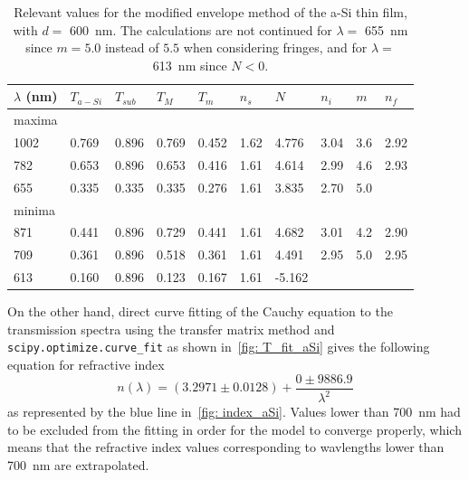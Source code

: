 \begin{table}[tbp]
\centering
\begin{tabular}{llllllllll}
\toprule
$\lambda$ (\unit{\nano\meter}) & $T_{a-Si} $ & $T_{sub}$ & $T_{M} $  & $T_{m}$ & $n_{s}$ & $N$ & $n_{i}$ & $m$ & $n_{f}$    \\
\midrule
\multicolumn{10}{l}{maxima}                                                                 \\
1002 & 0.769 & 0.896 & 0.769 & 0.452 & 1.62 & 4.776  & 3.04 & 3.6                         & 2.92 \\
782  & 0.653 & 0.896 & 0.653 & 0.416 & 1.61 & 4.614  & 2.99 & 4.6                         & 2.93 \\
655  & 0.335 & 0.335 & 0.335 & 0.276 & 1.61 & 3.835  & 2.70 & 5.0  						  &      \\
\midrule
\multicolumn{10}{l}{minima}                                                                 \\
871  & 0.441 & 0.896 & 0.729 & 0.441 & 1.61 & 4.682  & 3.01 & 4.2                         & 2.90 \\
709  & 0.361 & 0.896 & 0.518 & 0.361 & 1.61 & 4.491  & 2.95 & 5.0                         & 2.95 \\
613  & 0.160 & 0.896 & 0.123 & 0.167 & 1.61 & -5.162 &      &              &      \\
\bottomrule
\end{tabular}
\caption{Relevant values for the modified envelope method of the a-Si thin film, with $d=$ \qty{600}{\nano\meter}. The calculations are not continued for $\lambda=$ \qty{655}{\nano\meter} since $m=5.0$ instead of $5.5$ when considering fringes, and for $\lambda=$ \qty{613}{\nano\meter} since $N<0$.}\label{tab: swanepoel_aSi}
\end{table}

On the other hand, direct curve fitting of the Cauchy equation to the transmission spectra using the transfer matrix method and \verb|scipy.optimize.curve_fit| as shown in~\ref{fig: T_fit_aSi} gives the following equation for refractive index 
\begin{equation}\label{eqn:aSi_direct_cauchy} 
    n(\lambda) = (3.2971\pm0.0128) + \frac{0\pm9886.9}{\lambda^2}
\end{equation}
as represented by the blue line in~\ref{fig: index_aSi}. Values lower than \qty{700}{\nano\meter} had to be excluded from the fitting in order for the model to converge properly, which means that the refractive index values corresponding to wavlengths lower than \qty{700}{\nano\meter} are extrapolated.

